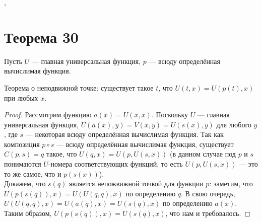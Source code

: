 \documentclass[a4paper,12pt]{article}
\begin{document}
    \sep
    \section {Теорема 30}
    {
        \noindent
        Пусть $U$ --- главная универсальная функция, $p$ --- всюду определённая вычислимая функция.
    }
    \begin{theorem}
        Теорема о неподвижной точке: существует такое $t$, что $U(t, x)=U(p(t), x)$ при любых $x$.
    \end{theorem}
    \begin{proof}
        Рассмотрим функцию $a(x) = U(x, x)$. Поскольку $U$ --- главная универсальная функция, $U(a(x), y)=V(x, y)=U(s(x), y)$ для любого $y$, где $s$ --- некоторая всюду определённая вычислимая функция.
        Так как композиция $p \circ s$ --- всюду определённая вычислимая функция, существует $C(p, s) = q$ такое, что $U(q, x)=U(p, U(s, x))$ (в данном случае под $p$ и $s$ понимаются $U$-номера соответствующих функций, то есть $U(p, U(s, x))$ --- это то же самое, что и $p(s(x))$).\\
        Докажем, что $s(q)$ является непожвижной точкой для функции $p$: заметим, что $U(p(s(q)), x)=U(U(q, q), x)$ по определению $q$. В свою очередь, $U(U(q, q), x)=U(a(q), x)=U(s(q), x)$ по определению $a(x)$. Таким образом, $U(p(s(q)), x)=U(s(q), x)$, что нам и требовалось.
    \end{proof}
    
    
\end{document}
